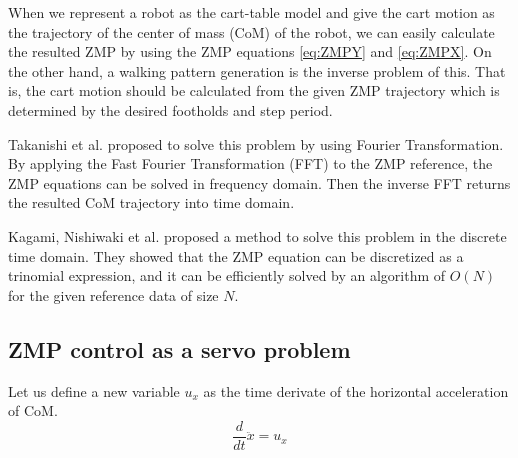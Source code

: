 When we represent a robot as the cart-table model and give
the cart motion as the trajectory of the center of mass (CoM) of the robot,
we can easily calculate the resulted ZMP by using the ZMP equations
\ref{eq:ZMPY} and \ref{eq:ZMPX}.
On the other hand, a walking pattern generation is the inverse problem of
this. That is, the cart motion should be calculated from the given ZMP
trajectory which is determined by the desired footholds and step period.
\par
Takanishi et al. proposed to solve this problem by using Fourier Transformation.
By applying the Fast Fourier Transformation (FFT) to the ZMP reference,
the ZMP equations can be solved in frequency domain. Then the inverse
FFT returns the resulted CoM trajectory into time domain.
\par
Kagami, Nishiwaki et al. proposed a method to solve this problem in the discrete
time domain. They showed that the ZMP equation can be discretized as a trinomial expression,
and it can be efficiently solved by an algorithm of $O(N)$ for the given reference data
of size $N$.
\subsection{ZMP control as a servo problem}
Let us define a new variable $u_x$ as the time derivate of the horizontal acceleration of CoM.
\begin{equation}
\frac{d}{dt}\ddot{x} = u_x
\label{eq:CoMAcceleration}
\end{equation}

